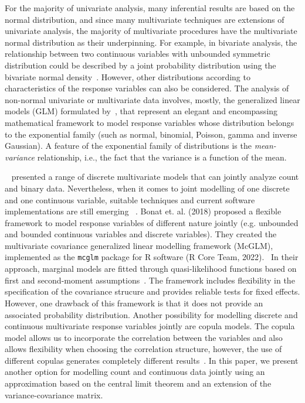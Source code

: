 \documentclass[useAMS,referee]{biom}
\begin{document}
For the majority of univariate analysis, many inferential results are based on the normal distribution, and since many multivariate techniques are extensions of univariate analysis, the majority of multivariate procedures have the multivariate normal distribution as their underpinning. For example, in bivariate analysis, the relationship between two continuous variables with unbounded symmetric distribution could be described by a joint probability distribution using the bivariate normal density~\citep{jobson2012applied}. However, other distributions according to characteristics of the response variables can also be considered. The analysis of non-normal univariate or multivariate data involves, mostly, the generalized linear models (GLM) formulated by~\cite{nelder1972generalized}, that represent an elegant and encompassing mathematical framework to model response variables whose distribution belongs to the exponential family (such as normal, binomial, Poisson, gamma and inverse Gaussian). A feature of the exponential family of distributions is the  \textit{mean-variance} relationship, i.e., the fact that the variance is a function of the mean. 

~\cite{johnson1997multivariate} presented a range of discrete multivariate models that can jointly analyze count and binary data. Nevertheless, when it comes to joint modelling of one discrete and one continuous variable, suitable techniques and current software implementations are still emerging ~\citep{bonat2016multivariate}. Bonat et. al. (2018) proposed a flexible framework to model response variables of different nature jointly (e.g. unbounded and bounded continuous variables and discrete variables). They created the multivariate covariance generalized linear modelling framework (McGLM), implemented as the \texttt{mcglm} package for R software (R Core Team, 2022).~\nocite{team2022r} In their approach, marginal models are fitted through quasi-likelihood functions based on first and second-moment assumptions~\citep{bonat2017modelling,bonat2018multiple}. The framework includes flexibility in the specification of the covariance strucure and provides reliable tests for fixed effects. However, one drawback of this framework is that it does not provide an associated probability distribution. Another possibility for modelling discrete and continuous multivariate response variables jointly are copula models. The copula model allows us to incorporate the correlation between the variables and also allows flexibility when choosing the correlation structure, however, the use of different copulas generates completely different results~\citep{nikoloulopoulos2009modeling,krupskii2013factor}. In this paper, we present another option for modelling  count and continuous data jointly using an approximation based on the central limit theorem and an extension of the variance-covariance matrix. 
\end{document}
